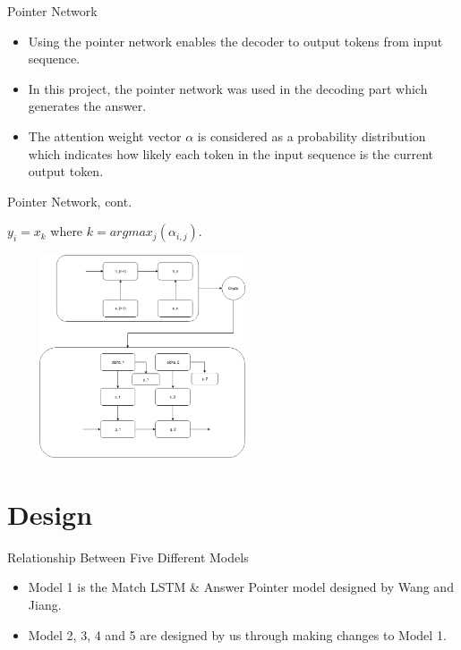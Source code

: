 \documentclass{beamer}
\begin{document}
\begin{frame}{Pointer Network}
    \begin{itemize}
        \item Using the pointer network enables the decoder to output tokens from input sequence.
        \item In this project, the pointer network was used in the decoding part which generates the answer.
        \item The attention weight vector $\alpha$ is considered as a probability distribution which indicates how likely each token in the input sequence is the current output token.
    \end{itemize}
\end{frame}

\begin{frame}{Pointer Network, cont.}
    \begin{examples}
        $y_i = x_k$ where $k = argmax_j(\alpha _{i,j}).$
        \begin{center}
            \includegraphics[width=8cm, height=6cm]{figures/pointerNetwork.png}
        \end{center}
    \end{examples}


\end{frame}


\section{Design}

\begin{frame}{Relationship Between Five Different Models}
    \begin{itemize}
        \item Model 1 is the Match LSTM \& Answer Pointer model designed by Wang and Jiang.
        \item Model 2, 3, 4 and 5 are designed by us through making changes to Model 1.
    \end{itemize}
\end{frame}
\end{document}
